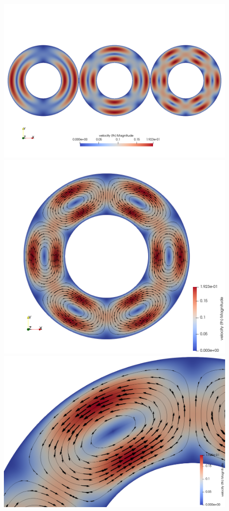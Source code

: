 \begin{center}
\includegraphics[width=12cm]{python_codes/fieldstone_35/images/vels}\\
\includegraphics[width=12cm]{python_codes/fieldstone_35/images/psi}\\
\includegraphics[width=12cm]{python_codes/fieldstone_35/images/psi_arrows}
\end{center}

